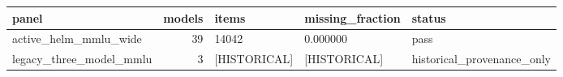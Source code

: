\begin{tabular}{lrlll}
\toprule
panel & models & items & missing\_fraction & status \\
\midrule
active\_helm\_mmlu\_wide & 39 & 14042 & 0.000000 & pass \\
legacy\_three\_model\_mmlu & 3 & [HISTORICAL] & [HISTORICAL] & historical\_provenance\_only \\
\bottomrule
\end{tabular}
